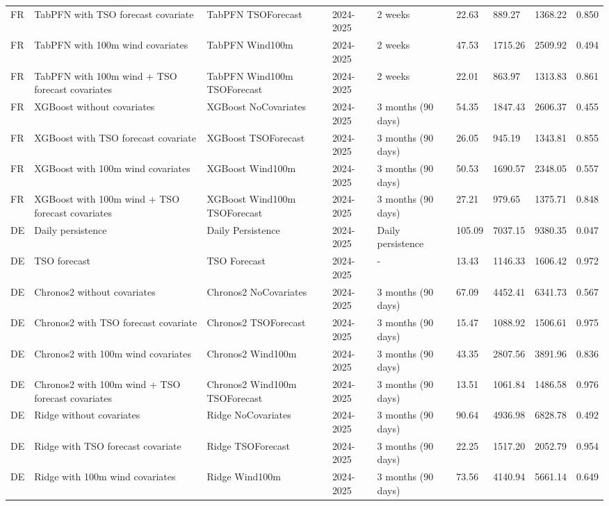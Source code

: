 \begin{longtable}{lllllllll}
FR & TabPFN with TSO forecast covariate & TabPFN TSOForecast & 2024-2025 & 2 weeks & 22.63 & 889.27 & 1368.22 & 0.850 \\
FR & TabPFN with 100m wind covariates & TabPFN Wind100m & 2024-2025 & 2 weeks & 47.53 & 1715.26 & 2509.92 & 0.494 \\
FR & TabPFN with 100m wind + TSO forecast covariates & TabPFN Wind100m TSOForecast & 2024-2025 & 2 weeks & 22.01 & 863.97 & 1313.83 & 0.861 \\
FR & XGBoost without covariates & XGBoost NoCovariates & 2024-2025 & 3 months (90 days) & 54.35 & 1847.43 & 2606.37 & 0.455 \\
FR & XGBoost with TSO forecast covariate & XGBoost TSOForecast & 2024-2025 & 3 months (90 days) & 26.05 & 945.19 & 1343.81 & 0.855 \\
FR & XGBoost with 100m wind covariates & XGBoost Wind100m & 2024-2025 & 3 months (90 days) & 50.53 & 1690.57 & 2348.05 & 0.557 \\
FR & XGBoost with 100m wind + TSO forecast covariates & XGBoost Wind100m TSOForecast & 2024-2025 & 3 months (90 days) & 27.21 & 979.65 & 1375.71 & 0.848 \\
DE & Daily persistence & Daily Persistence & 2024-2025 & Daily persistence & 105.09 & 7037.15 & 9380.35 & 0.047 \\
DE & TSO forecast & TSO Forecast & 2024-2025 & - & 13.43 & 1146.33 & 1606.42 & 0.972 \\
DE & Chronos2 without covariates & Chronos2 NoCovariates & 2024-2025 & 3 months (90 days) & 67.09 & 4452.41 & 6341.73 & 0.567 \\
DE & Chronos2 with TSO forecast covariate & Chronos2 TSOForecast & 2024-2025 & 3 months (90 days) & 15.47 & 1088.92 & 1506.61 & 0.975 \\
DE & Chronos2 with 100m wind covariates & Chronos2 Wind100m & 2024-2025 & 3 months (90 days) & 43.35 & 2807.56 & 3891.96 & 0.836 \\
DE & Chronos2 with 100m wind + TSO forecast covariates & Chronos2 Wind100m TSOForecast & 2024-2025 & 3 months (90 days) & 13.51 & 1061.84 & 1486.58 & 0.976 \\
DE & Ridge without covariates & Ridge NoCovariates & 2024-2025 & 3 months (90 days) & 90.64 & 4936.98 & 6828.78 & 0.492 \\
DE & Ridge with TSO forecast covariate & Ridge TSOForecast & 2024-2025 & 3 months (90 days) & 22.25 & 1517.20 & 2052.79 & 0.954 \\
DE & Ridge with 100m wind covariates & Ridge Wind100m & 2024-2025 & 3 months (90 days) & 73.56 & 4140.94 & 5661.14 & 0.649 \\

\end{longtable}
